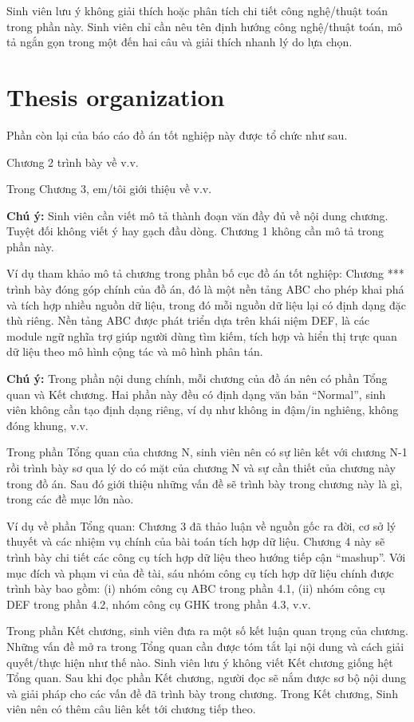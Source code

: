 \documentclass[../Main.tex]{subfiles}
\begin{document}
Sinh viên lưu ý không giải thích hoặc phân tích chi tiết công nghệ/thuật toán trong phần này.
Sinh viên chỉ cần nêu tên định hướng công nghệ/thuật toán, mô tả ngắn gọn trong một đến hai câu và giải thích nhanh lý do lựa chọn.

\section{Thesis organization}
\label{section:1.4}
Phần còn lại của báo cáo đồ án tốt nghiệp này được tổ chức như sau.

Chương 2 trình bày về v.v.

Trong Chương 3, em/tôi giới thiệu về v.v.

\textbf{Chú ý:}
Sinh viên cần viết mô tả thành đoạn văn đầy đủ về nội dung chương.
Tuyệt đối không viết ý hay gạch đầu dòng.
Chương 1 không cần mô tả trong phần này.

Ví dụ tham khảo mô tả chương trong phần bố cục đồ án tốt nghiệp: Chương *** trình bày đóng góp chính của đồ án, đó là một nền tảng ABC cho phép khai phá và tích hợp nhiều nguồn dữ liệu, trong đó mỗi nguồn dữ liệu lại có định dạng đặc thù riêng.
Nền tảng ABC được phát triển dựa trên khái niệm DEF, là các module ngữ nghĩa trợ giúp người dùng tìm kiếm, tích hợp và hiển thị trực quan dữ liệu theo mô hình cộng tác và mô hình phân tán.

\textbf{Chú ý:}
Trong phần nội dung chính, mỗi chương của đồ án nên có phần Tổng quan và Kết chương.
Hai phần này đều có định dạng văn bản “Normal”, sinh viên không cần tạo định dạng riêng, ví dụ như không in đậm/in nghiêng, không đóng khung, v.v.

Trong phần Tổng quan của chương N, sinh viên nên có sự liên kết với chương N-1 rồi trình bày sơ qua lý do có mặt của chương N và sự cần thiết của chương này trong đồ án.
Sau đó giới thiệu những vấn đề sẽ trình bày trong chương này là gì, trong các đề mục lớn nào.

Ví dụ về phần Tổng quan: Chương 3 đã thảo luận về nguồn gốc ra đời, cơ sở lý thuyết và các nhiệm vụ chính của bài toán tích hợp dữ liệu.
Chương 4 này sẽ trình bày chi tiết các công cụ tích hợp dữ liệu theo hướng tiếp cận “mashup”.
Với mục đích và phạm vi của đề tài, sáu nhóm công cụ tích hợp dữ liệu chính được trình bày bao gồm: (i) nhóm công cụ ABC trong phần 4.1, (ii) nhóm công cụ DEF trong phần 4.2, nhóm công cụ GHK trong phần 4.3, v.v.

Trong phần Kết chương, sinh viên đưa ra một số kết luận quan trọng của chương.
Những vấn đề mở ra trong Tổng quan cần được tóm tắt lại nội dung và cách giải quyết/thực hiện như thế nào.
Sinh viên lưu ý không viết Kết chương giống hệt Tổng quan.
Sau khi đọc phần Kết chương, người đọc sẽ nắm được sơ bộ nội dung và giải pháp cho các vấn đề đã trình bày trong chương.
Trong Kết chương, Sinh viên nên có thêm câu liên kết tới chương tiếp theo.
\end{document}
